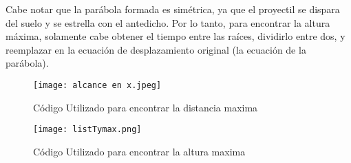 \documentclass{article}
\begin{document}
Cabe notar que la par\'abola formada es simétrica, ya que el proyectil se dispara del suelo y se estrella con el antedicho. Por lo tanto, para encontrar la altura m\'axima, solamente cabe obtener el tiempo entre las ra\'ices, dividirlo entre dos, y reemplazar en la ecuaci\'on de desplazamiento original (la ecuaci\'on de la par\'abola).\\

\begin{figure}[h!]
    \centering
    \texttt{[image: alcance en x.jpeg]}
    \caption{C\'odigo Utilizado para encontrar la distancia maxima}
    \label{fig:Codigo_Utilizado}
\end{figure}

\begin{figure}[h!]
    \centering
    \texttt{[image: listTymax.png]}
    \caption{C\'odigo Utilizado para encontrar la altura maxima}
    \label{fig:Codigo_Utilizado}
\end{figure}



\newpage
\end{document}
